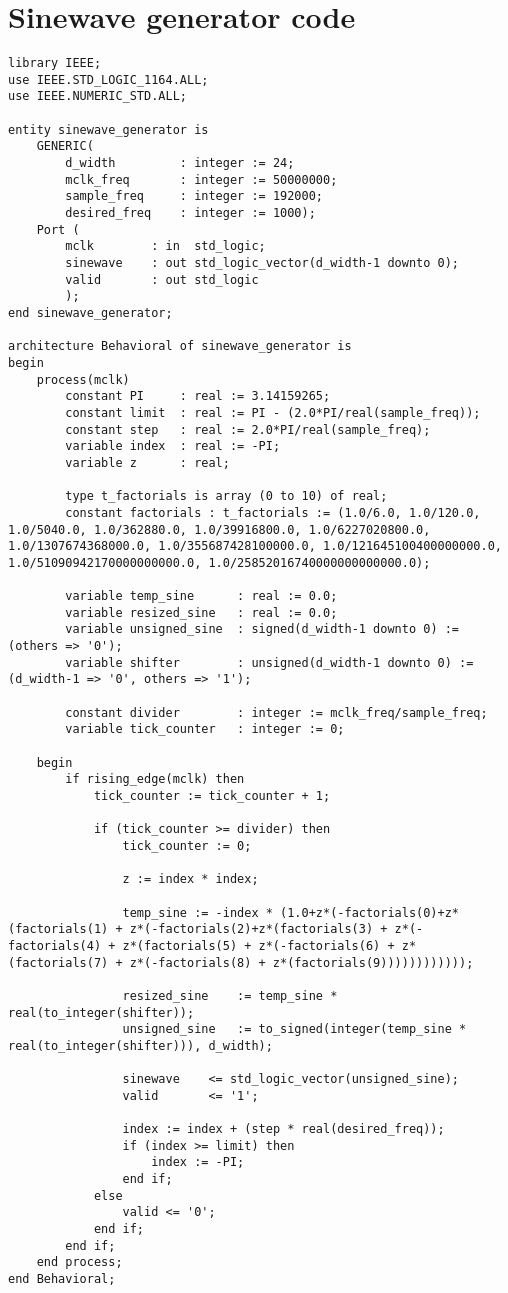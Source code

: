 \section*{Sinewave generator code}
\begin{lstlisting}
library IEEE;
use IEEE.STD_LOGIC_1164.ALL;
use IEEE.NUMERIC_STD.ALL;

entity sinewave_generator is
    GENERIC(
        d_width         : integer := 24;
        mclk_freq       : integer := 50000000;
        sample_freq     : integer := 192000;
        desired_freq    : integer := 1000);
    Port (
        mclk        : in  std_logic;
        sinewave    : out std_logic_vector(d_width-1 downto 0);
        valid       : out std_logic
        ); 
end sinewave_generator;

architecture Behavioral of sinewave_generator is
begin
    process(mclk)
        constant PI     : real := 3.14159265;
        constant limit  : real := PI - (2.0*PI/real(sample_freq));
        constant step   : real := 2.0*PI/real(sample_freq);
        variable index  : real := -PI;
        variable z      : real;

        type t_factorials is array (0 to 10) of real;
        constant factorials : t_factorials := (1.0/6.0, 1.0/120.0, 1.0/5040.0, 1.0/362880.0, 1.0/39916800.0, 1.0/6227020800.0, 1.0/1307674368000.0, 1.0/355687428100000.0, 1.0/121645100400000000.0, 1.0/51090942170000000000.0, 1.0/25852016740000000000000.0);

        variable temp_sine      : real := 0.0;
        variable resized_sine   : real := 0.0;
        variable unsigned_sine  : signed(d_width-1 downto 0) := (others => '0');
        variable shifter        : unsigned(d_width-1 downto 0) := (d_width-1 => '0', others => '1');

        constant divider        : integer := mclk_freq/sample_freq;
        variable tick_counter   : integer := 0;

    begin
        if rising_edge(mclk) then
            tick_counter := tick_counter + 1;

            if (tick_counter >= divider) then
                tick_counter := 0;

                z := index * index;

                temp_sine := -index * (1.0+z*(-factorials(0)+z*(factorials(1) + z*(-factorials(2)+z*(factorials(3) + z*(-factorials(4) + z*(factorials(5) + z*(-factorials(6) + z*(factorials(7) + z*(-factorials(8) + z*(factorials(9))))))))))));

                resized_sine    := temp_sine * real(to_integer(shifter));
                unsigned_sine   := to_signed(integer(temp_sine * real(to_integer(shifter))), d_width);

                sinewave    <= std_logic_vector(unsigned_sine);
                valid       <= '1';

                index := index + (step * real(desired_freq));
                if (index >= limit) then
                    index := -PI;
                end if;
            else
                valid <= '0';
            end if;
        end if;
    end process;
end Behavioral;
\end{lstlisting}

